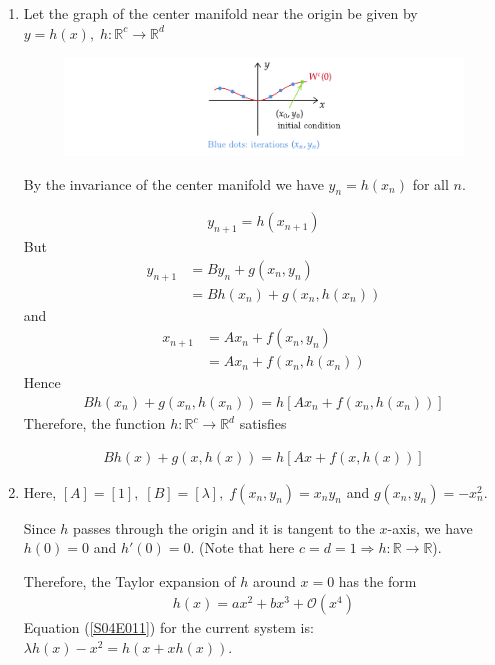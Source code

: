 \begin{solution}[4.1]
\begin{enumerate}
\item Let the graph of the center manifold near the origin be given by $y = h(x), \; h:\mathbb{R}^c \rightarrow \mathbb{R}^d$
\begin{figure}[h]
	\centering
	\includegraphics[scale=0.9]{figures/solutions/ch4/S01D01.pdf}
\end{figure}
By the invariance of the center manifold we have $y_n = h(x_n)$ for all $n$.

\begin{align}
	y_{n+1} = h(x_{n+1})
\end{align}
But
\begin{align}
	y_{n+1} &= By_n + g(x_n, y_n) \\
	&= Bh(x_n) + g(x_n, h(x_n))
\end{align}
and
\begin{align}
	x_{n+1} &= Ax_n + f(x_n, y_n) \\
	&= Ax_n + f(x_n, h(x_n))
\end{align}
Hence
\begin{align}
	Bh(x_n) + g(x_n, h(x_n)) = h[Ax_n + f(x_n, h(x_n))]
\end{align}
Therefore, the function $h:\mathbb{R}^c \rightarrow \mathbb{R}^d$ satisfies

\begin{align}\label{S04E011}\boxed{
		Bh(x) + g(x, h(x)) = h[Ax + f(x, h(x))]
	}
\end{align}


\item Here, $[A] = [1],\; [B] = [\lambda], \; f(x_n,y_n) = x_ny_n$ and $g(x_n, y_n)=-x_n^2$.

Since $h$ passes through the origin and it is tangent to the $x$-axis, we have $h(0)=0$ and $h'(0)=0$. (Note that here $c=d=1 \Rightarrow h:\mathbb{R} \rightarrow \mathbb{R}$).

Therefore, the Taylor expansion of $h$ around $x=0$ has the form
\begin{align}\label{S04E012}
	h(x) = ax^2 + bx^3 + \mathcal{O}(x^4)
\end{align}
Equation (\ref{S04E011}) for the current system is: $\lambda h(x) - x^2 = h(x + xh(x))$.


\end{enumerate}
\end{solution}
